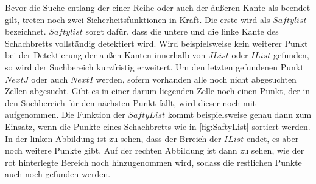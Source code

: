 %
%
%
%
%
%

Bevor die Suche entlang der einer Reihe oder auch der äußeren Kante als beendet gilt, treten noch zwei Sicherheitsfunktionen in Kraft. Die erste wird als $Saftylist$ bezeichnet. $Saftylist$ sorgt dafür, dass die untere und die linke Kante des Schachbretts vollständig detektiert wird. Wird beispielsweise kein weiterer Punkt bei der Detektierung der außen Kanten innerhalb von $JList$ oder $IList$ gefunden, so wird der Suchbereich kurzfristig erweitert. Um den letzten gefundenen Punkt $NextJ$ oder auch $NextI$ werden, sofern vorhanden alle noch nicht abgesuchten Zellen abgesucht. Gibt es in einer darum liegenden Zelle noch einen Punkt, der in den Suchbereich für den nächsten Punkt fällt, wird dieser noch mit aufgenommen. Die Funktion der $SaftyList$ kommt beispielsweise genau dann zum Einsatz, wenn die Punkte eines Schachbretts wie in \ref{fig:SaftyList} sortiert werden. In der linken Abbildung ist zu sehen, dass der Brreich der $IList$ endet, es aber noch weitere Punkte gibt. Auf der rechten Abbildung ist dann zu sehen, wie der rot hinterlegte Bereich noch hinzugenommen wird, sodass die restlichen Punkte auch noch gefunden werden.\\

